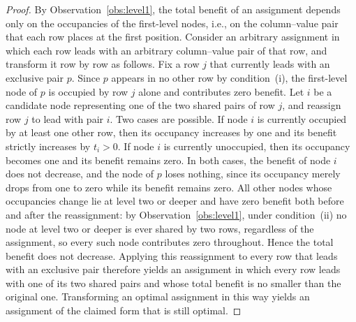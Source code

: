 \begin{proof}
By Observation~\ref{obs:level1}, the total benefit of an assignment depends only on the occupancies of the first-level nodes, i.e., on the column--value pair that each row places at the first position. Consider an arbitrary assignment in which each row leads with an arbitrary column--value pair of that row, and transform it row by row as follows. Fix a row $j$ that currently leads with an exclusive pair $p$. Since $p$ appears in no other row by condition~(i), the first-level node of $p$ is occupied by row $j$ alone and contributes zero benefit. Let $i$ be a candidate node representing one of the two shared pairs of row $j$, and reassign row $j$ to lead with pair $i$. Two cases are possible. If node $i$ is currently occupied by at least one other row, then its occupancy increases by one and its benefit strictly increases by $t_i>0$. If node $i$ is currently unoccupied, then its occupancy becomes one and its benefit remains zero. In both cases, the benefit of node $i$ does not decrease, and the node of $p$ loses nothing, since its occupancy merely drops from one to zero while its benefit remains zero. All other nodes whose occupancies change lie at level two or deeper and have zero benefit both before and after the reassignment: by Observation~\ref{obs:level1}, under condition~(ii) no node at level two or deeper is ever shared by two rows, regardless of the assignment, so every such node contributes zero throughout. Hence the total benefit does not decrease. Applying this reassignment to every row that leads with an exclusive pair therefore yields an assignment in which every row leads with one of its two shared pairs and whose total benefit is no smaller than the original one. Transforming an optimal assignment in this way yields an assignment of the claimed form that is still optimal.
\end{proof}

